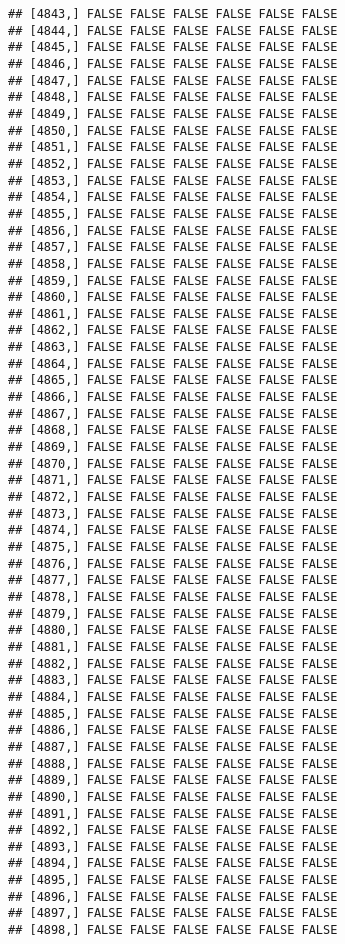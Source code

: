 \documentclass[
]{article}
\begin{document}
\begin{verbatim}
## [4843,] FALSE FALSE FALSE FALSE FALSE FALSE
## [4844,] FALSE FALSE FALSE FALSE FALSE FALSE
## [4845,] FALSE FALSE FALSE FALSE FALSE FALSE
## [4846,] FALSE FALSE FALSE FALSE FALSE FALSE
## [4847,] FALSE FALSE FALSE FALSE FALSE FALSE
## [4848,] FALSE FALSE FALSE FALSE FALSE FALSE
## [4849,] FALSE FALSE FALSE FALSE FALSE FALSE
## [4850,] FALSE FALSE FALSE FALSE FALSE FALSE
## [4851,] FALSE FALSE FALSE FALSE FALSE FALSE
## [4852,] FALSE FALSE FALSE FALSE FALSE FALSE
## [4853,] FALSE FALSE FALSE FALSE FALSE FALSE
## [4854,] FALSE FALSE FALSE FALSE FALSE FALSE
## [4855,] FALSE FALSE FALSE FALSE FALSE FALSE
## [4856,] FALSE FALSE FALSE FALSE FALSE FALSE
## [4857,] FALSE FALSE FALSE FALSE FALSE FALSE
## [4858,] FALSE FALSE FALSE FALSE FALSE FALSE
## [4859,] FALSE FALSE FALSE FALSE FALSE FALSE
## [4860,] FALSE FALSE FALSE FALSE FALSE FALSE
## [4861,] FALSE FALSE FALSE FALSE FALSE FALSE
## [4862,] FALSE FALSE FALSE FALSE FALSE FALSE
## [4863,] FALSE FALSE FALSE FALSE FALSE FALSE
## [4864,] FALSE FALSE FALSE FALSE FALSE FALSE
## [4865,] FALSE FALSE FALSE FALSE FALSE FALSE
## [4866,] FALSE FALSE FALSE FALSE FALSE FALSE
## [4867,] FALSE FALSE FALSE FALSE FALSE FALSE
## [4868,] FALSE FALSE FALSE FALSE FALSE FALSE
## [4869,] FALSE FALSE FALSE FALSE FALSE FALSE
## [4870,] FALSE FALSE FALSE FALSE FALSE FALSE
## [4871,] FALSE FALSE FALSE FALSE FALSE FALSE
## [4872,] FALSE FALSE FALSE FALSE FALSE FALSE
## [4873,] FALSE FALSE FALSE FALSE FALSE FALSE
## [4874,] FALSE FALSE FALSE FALSE FALSE FALSE
## [4875,] FALSE FALSE FALSE FALSE FALSE FALSE
## [4876,] FALSE FALSE FALSE FALSE FALSE FALSE
## [4877,] FALSE FALSE FALSE FALSE FALSE FALSE
## [4878,] FALSE FALSE FALSE FALSE FALSE FALSE
## [4879,] FALSE FALSE FALSE FALSE FALSE FALSE
## [4880,] FALSE FALSE FALSE FALSE FALSE FALSE
## [4881,] FALSE FALSE FALSE FALSE FALSE FALSE
## [4882,] FALSE FALSE FALSE FALSE FALSE FALSE
## [4883,] FALSE FALSE FALSE FALSE FALSE FALSE
## [4884,] FALSE FALSE FALSE FALSE FALSE FALSE
## [4885,] FALSE FALSE FALSE FALSE FALSE FALSE
## [4886,] FALSE FALSE FALSE FALSE FALSE FALSE
## [4887,] FALSE FALSE FALSE FALSE FALSE FALSE
## [4888,] FALSE FALSE FALSE FALSE FALSE FALSE
## [4889,] FALSE FALSE FALSE FALSE FALSE FALSE
## [4890,] FALSE FALSE FALSE FALSE FALSE FALSE
## [4891,] FALSE FALSE FALSE FALSE FALSE FALSE
## [4892,] FALSE FALSE FALSE FALSE FALSE FALSE
## [4893,] FALSE FALSE FALSE FALSE FALSE FALSE
## [4894,] FALSE FALSE FALSE FALSE FALSE FALSE
## [4895,] FALSE FALSE FALSE FALSE FALSE FALSE
## [4896,] FALSE FALSE FALSE FALSE FALSE FALSE
## [4897,] FALSE FALSE FALSE FALSE FALSE FALSE
## [4898,] FALSE FALSE FALSE FALSE FALSE FALSE

\end{verbatim}
\end{document}
